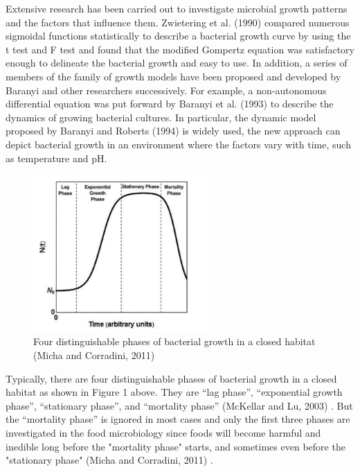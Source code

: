 \documentclass[11pt, a4paper]{article}
\begin{document}
Extensive research has been carried out to investigate microbial growth patterns and the factors that influence them. Zwietering et al. (1990) \cite{zwietering1990modeling} compared numerous sigmoidal functions statistically to describe a bacterial growth curve by using the t test and F test and found that the modified Gompertz equation was satisfactory enough to delineate the bacterial growth and easy to use. In addition, a series of members of the family of growth models have been proposed and developed by Baranyi and other researchers successively. For example, a non-autonomous differential equation was put forward by Baranyi et al. (1993) \cite{baranyi1993non} to describe the dynamics of growing bacterial cultures. In particular, the dynamic model proposed by Baranyi and Roberts (1994) \cite{baranyi1994dynamic} is widely used, the new approach can depict bacterial growth in an environment where the factors vary with time, such as temperature and pH.

\begin{figure}[H]
    \centering
    \includegraphics[width=0.6\textwidth]{figure1}
    \caption{Four distinguishable phases of bacterial growth in a closed habitat (Micha and Corradini, 2011) \cite{peleg2011microbial}}
    \label{figure1}
\end{figure}

Typically, there are four distinguishable phases of bacterial growth in a closed habitat as shown in Figure 1 above. They are “lag phase”, “exponential growth phase”, “stationary phase”, and “mortality phase” (McKellar and Lu, 2003) \cite{mckellar2003modeling}. But the “mortality phase” is ignored in most cases and only the first three phases are investigated in the food microbiology since foods will become harmful and inedible long before the "mortality phase" starts, and sometimes even before the "stationary phase" (Micha and Corradini, 2011) \cite{peleg2011microbial}.  
\end{document}
